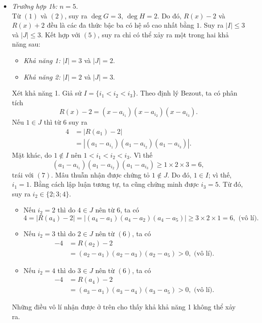 \begin{bt}
{\begin{enumerate}
\begin{itemize}
				Tiếp theo, gọi $I$ là tập hợp các chỉ số $i$ mà $R(a_i)=2$ và $J$ là tập hợp các chỉ số $i$ mà $R(a_i)=-2$. Theo Nhận xét 2, hiển nhiên ta có
				\[ |I|+|J|=n.\tag{5} \]
				\item \textit{Trường hợp 1b:} $n=5$.\\
				Từ $(1)$ và $(2)$, suy ra $\deg G=3$, $\deg H=2$. Do đó, $R(x)-2$ và $R(x)+2$ đều là các đa thức bậc ba có hệ số cao nhất bằng $1$. Suy ra $|I|\leq 3$ và $|J|\leq 3$. Kết hợp với $(5)$, suy ra chỉ có thể xảy ra một trong hai khả năng sau:
				\begin{itemize}
					\item \textit{Khả năng 1:} $|I|=3$ và $|J|=2$.
					\item \textit{Khả năng 2:} $|I|=2$ và $|J|=3$.
				\end{itemize}
				Xét khả năng 1. Giả sử $I=\{i_1<i_2<i_3\}$. Theo định lý Bezout, ta có phân tích
				\[ R(x)-2=(x-a_{i_1})(x-a_{i_2})(x-a_{i_3}).\tag{6}\]
				Nếu $1\in J$ thì từ $6$ suy ra
				\begin{align*}
				4&=|R(a_1)-2|\\ 
				&=|(a_1-a_{i_1})(a_1-a_{i_2})(a_1-a_{i_3})|.\tag{7}
				\end{align*}
				Mặt khác, do $1\not\in I$ nên $1<i_1<i_2<i_3$. Vì thế $$(a_1-a_{i_1})(a_1-a_{i_2})(a_1-a_{i_3})\geq 1\times 2\times 3=6,$$
				trái với $(7)$. Mâu thuẫn nhận được chứng tỏ $1\not\in J$. Do đó, $1\in I$; vì thế, $i_1=1$.
				Bằng cách lập luận tương tự, ta cũng chứng minh được $i_3=5$.
				Từ đó, suy ra $i_2\in\{2;3;4\}.$
				\begin{itemize}
					\item Nếu $i_2=2$ thì do $4\in J$ nên từ $6$, ta có
					$$ 4=|R(a_4)-2|=|(a_4-a_1)(a_4-a_2)(a_4-a_5)|\geq 3\times 2\times 1=6, \mbox{ (vô lí)}.$$
					\item Nếu $i_2=3$ thì do $2\in J$ nên từ $(6)$, ta có
					\begin{align*}
					-4&=R(a_2)-2\\
					&=(a_2-a_1)(a_2-a_3)(a_2-a_5)>0, \mbox{ (vô lí)}.
					\end{align*}
					\item Nếu $i_2=4$ thì do $3\in J$ nên từ $(6)$, ta có
					\begin{align*}
					-4&=R(a_4)-2\\
					&=(a_3-a_1)(a_3-a_4)(a_3-a_5)>0, \mbox{ (vô lí)}.
					\end{align*}
				\end{itemize}
				Những điều vô lí nhận được ở trên cho thấy khả khả năng 1 không thể xảy ra.\\

\end{itemize}
\end{enumerate}}
\end{bt}
